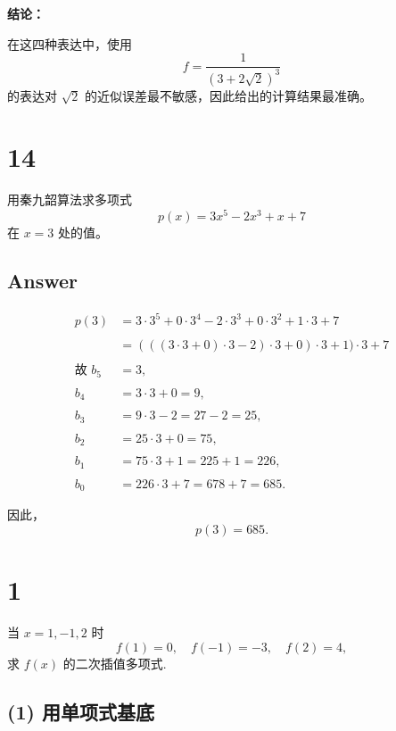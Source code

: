 \documentclass[11pt]{article}
\begin{document}
\textbf{结论：}

在这四种表达中，使用\\
\[
\boxed{
f=\frac{1}{(3+2\sqrt{2})^3}
}
\] 的表达对 \(\sqrt{2}\) 的近似误差最不敏感，因此给出的计算结果最准确。

    \section{14}\label{section}

用秦九韶算法求多项式 \[
p(x)=3x^5-2x^3+x+7
\] 在 \(x=3\) 处的值。

\subsection{Answer}\label{answer}

\[
\begin{aligned}
p(3) &= 3\cdot 3^5 + 0\cdot 3^4 -2\cdot 3^3 + 0\cdot 3^2 + 1\cdot 3 + 7 \\\\
&= (((3\cdot 3 + 0)\cdot 3 -2)\cdot 3 + 0)\cdot 3 + 1)\cdot 3 + 7 \\\\
\text{故 } b_5 &= 3, \\\\
b_4 &= 3\cdot 3 + 0 = 9, \\\\
b_3 &= 9\cdot 3 - 2 = 27 - 2 = 25, \\\\
b_2 &= 25\cdot 3 + 0 = 75, \\\\
b_1 &= 75\cdot 3 + 1 = 225 + 1 = 226, \\\\
b_0 &= 226\cdot 3 + 7 = 678 + 7 = 685.
\end{aligned}
\]

因此， \[
\boxed{
p(3) = 685.
}
\]

    \section{1}\label{section}

当 \(x = 1, -1, 2\) 时 \[
f(1)=0,\quad f(-1)=-3,\quad f(2)=4,
\] 求 \(f(x)\) 的二次插值多项式.

\subsection{(1)
用单项式基底}\label{ux7528ux5355ux9879ux5f0fux57faux5e95}
\end{document}
